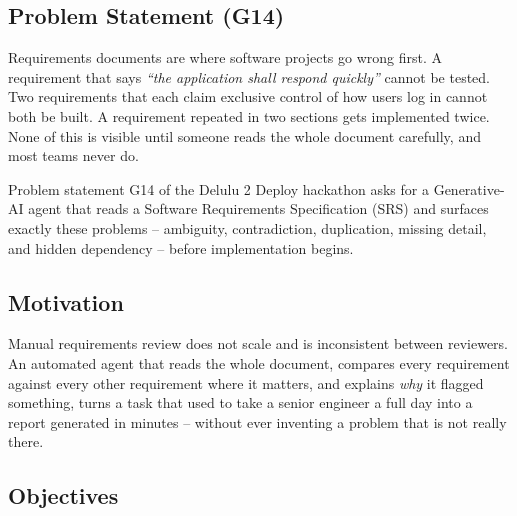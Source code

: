 \documentclass[11pt,a4paper]{article}
\begin{document}
\subsection{Problem Statement (G14)}

Requirements documents are where software projects go wrong first. A
requirement that says \emph{``the application shall respond quickly''} cannot
be tested. Two requirements that each claim exclusive control of how users
log in cannot both be built. A requirement repeated in two sections gets
implemented twice. None of this is visible until someone reads the whole
document carefully, and most teams never do.

Problem statement G14 of the Delulu 2 Deploy hackathon asks for a
Generative-AI agent that reads a Software Requirements Specification (SRS)
and surfaces exactly these problems -- ambiguity, contradiction, duplication,
missing detail, and hidden dependency -- before implementation begins.

\subsection{Motivation}

Manual requirements review does not scale and is inconsistent between
reviewers. An automated agent that reads the whole document, compares every
requirement against every other requirement where it matters, and explains
\emph{why} it flagged something, turns a task that used to take a senior
engineer a full day into a report generated in minutes -- without ever
inventing a problem that is not really there.

\subsection{Objectives}
\end{document}
